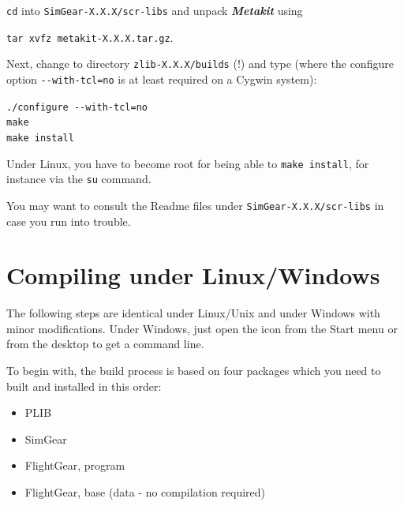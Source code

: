 \noindent
 \texttt{cd} into \texttt{SimGear-X.X.X/scr-libs} and unpack \textbf{\textit{Metakit}} using
 \medskip
 
 \noindent
 				\texttt{tar xvfz metakit-X.X.X.tar.gz}.
 	\medskip
 	
 \noindent			
 Next, change to directory \texttt{zlib-X.X.X/builds} (!) and type (where the configure option \texttt{-$ $-with-tcl=no} is at least required on a Cygwin system):
 \medskip

 \noindent
        \texttt{./configure -$ $-with-tcl=no}\\
        \texttt{make}\\
        \texttt{make install}
  \medskip

 \noindent
 Under Linux, you have to become root for being able to \texttt{make install}, for instance via the \texttt{su} command. 
 
  You may want to consult the Readme files under \texttt{SimGear-X.X.X/scr-libs} in case you run into trouble.

\section{Compiling \FlightGear{} under Linux/Windows\label{compilinglinwin} }

The following steps are identical under Linux/Unix and under Windows with minor
modifications. Under Windows, just open the \Cygwin{} icon from the Start menu or from
the desktop to get a command line.

To begin with, the \FlightGear{} build process is based on four packages which you need to built and installed in this order:

\begin{itemize}
\item PLIB
\item SimGear
\item FlightGear, program
\item FlightGear, base (data - no compilation required)
\end{itemize}


